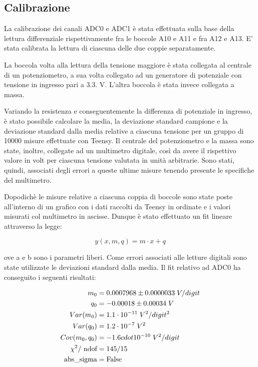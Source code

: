 \documentclass{article}[a4paper, oneside, 11pt]
\begin{document}
\subsection{Calibrazione}

La calibrazione dei canali ADC0 e ADC1 è stata effettuata sulla base della lettura differenziale rispettivamente fra le boccole A10 e A11 e fra A12 e A13. E’ stata calibrata la lettura di ciascuna delle due coppie separatamente.

La boccola volta alla lettura della tensione maggiore è stata collegata al centrale di un potenziometro, a sua volta collegato ad un generatore di potenziale con tensione in ingresso pari a 3.3. V. L’altra boccola è stata invece collegata a massa.

Variando la resistenza e conseguentemente la differenza di potenziale in ingresso, è stato possibile calcolare la media, la deviazione standard campione e la deviazione standard dalla media  relative a ciascuna tensione per un gruppo di 10000 misure effettuate con Teensy. Il centrale del potenziometro e la massa sono state, inoltre, collegate ad un multimetro digitale, così da avere il rispettivo valore in volt per ciascuna tensione valutata in unità arbitrarie. Sono stati, quindi, associati degli errori a queste ultime misure  tenendo presente le specifiche del multimetro.

Dopodichè le misure relative a ciascuna coppia di boccole sono state poste all’interno di un grafico con i dati raccolti da Teensy in ordinate e i valori misurati col multimetro in ascisse. Dunque è stato effettuato un fit lineare attraverso la legge:

\begin{equation}
y(x, m, q)  = m \cdot x + q
\end{equation}

ove a e b sono i parametri liberi. Come errori associati alle letture digitali sono state utilizzate le deviazioni standard dalla media. Il fit relativo ad ADC0 ha conseguito i seguenti risultati:

\begin{align*}
	m_0 &= 0.0007968 \pm  0.0000033   \; V/digit \\
	q_0 &= - 0.00018 \pm 0.00034  \; V \\
	Var(m_0)  &= 1.1 \cdot 10^{-11}  \; V^2 /digit^2 \\
	Var(q_0) &=1.2 \cdot 10^{-7} \; V^2 \\
	Cov(m_0, q_0) &= - 1.6 cdot 10^{-10} \; V^2  /digit \\
	{\chi}^2/\text{ ndof} &= {145 }/{15}\\ 
	\text{abs\_sigma} &= \rm False
\end{align*}
\end{document}
